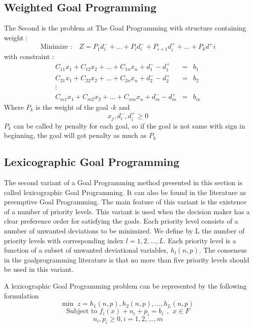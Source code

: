 \documentclass[twoside,twocolumn]{article}
\begin{document}
\subsection{Weighted Goal Programming}		
The Second is the problem at The Goal Programming with structure containing weight :
		\begin{equation*}
		\text{Minimize : }~~~ Z = P_1d^-_i + \dots + P_ld^-_i + P_{i+1}d^+_i +\dots + P_kd^+i
		\end{equation*}
		with constraint :
		\begin{equation*}
		\begin{array}{rcl}
		C_{11}x_1+C_{12}x_2 + \dots + C_{1n}x_n + d^-_1 - d^+_1&=&b_1\\
		C_{21}x_1+C_{22}x_2 + \dots + C_{2n}x_n + d^-_2- d^+_2&=&b_2\\
		\vdots&&\\
		C_{m1}x_1+C_{m2}x_2 + \dots + C_{mn}x_n + d^-_m - d^+_m&=&b_m
		\end{array}
		\end{equation*}
		Where $P_k$ is the weight of the goal -$k$
		and $$x_j,d^-_i,d^+_i \geq 0$$
		$P_k $ can be called by penalty for each goal, so if the goal is not same with sign in beginning, the goal will got penalty as much as $P_k$
		
\subsection{Lexicographic Goal Programming}
		The second variant of a Goal Programming method presented in this section is called lexicographic Goal Programming. It can also be found in the literature as preemptive Goal Programming. The main feature of this variant is the existence of a number of priority levels. This variant is used when the decision maker has a clear preference order for satisfying the goals. Each priority level consists of a number of unwanted deviations to be minimized. We define by L the number of priority levels with corresponding index $l = 1, 2, \dots , L.$ Each priority level is a function of a subset of unwanted deviational variables, $h_l(n, p)$. The consensus in the goalprogramming literature is that no more than five priority levels should be used in this variant.
		
		A lexicographic Goal Programming problem can be represented by the following
		formulation
		$$\text{min }~z = h_1(n,p),h_2(n,p),\dots,h_L(n,p)$$
		$$\text{Subject to } f_i(x)+n_i+p_i=b_i~~,~~x\in F$$
		$$n_i,p_i \geq 0, i = 1,2,\dots,m$$
		
\end{document}
